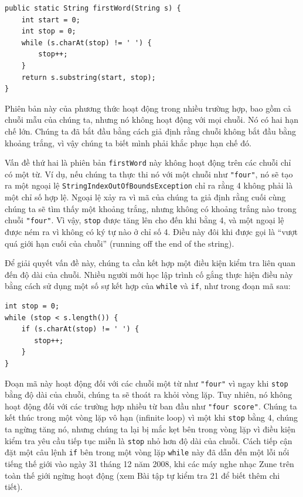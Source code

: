 \begin{verbatim}
public static String firstWord(String s) {
    int start = 0;
    int stop = 0;
    while (s.charAt(stop) != ' ') {
        stop++;
    }
    return s.substring(start, stop);
}
\end{verbatim}

Phiên bản này của phương thức hoạt động trong nhiều trường hợp, bao gồm cả chuỗi mẫu của chúng ta, nhưng nó không hoạt động với mọi chuỗi. Nó có hai hạn chế lớn. Chúng ta đã bắt đầu bằng cách giả định rằng chuỗi không bắt đầu bằng khoảng trắng, vì vậy chúng ta biết mình phải khắc phục hạn chế đó.

Vấn đề thứ hai là phiên bản \texttt{firstWord} này không hoạt động trên các chuỗi chỉ có một từ. Ví dụ, nếu chúng ta thực thi nó với một chuỗi như \texttt{"four"}, nó sẽ tạo ra một ngoại lệ \texttt{StringIndex\allowbreak{}OutOfBounds\allowbreak{}Exception} chỉ ra rằng 4 không phải là một chỉ số hợp lệ. Ngoại lệ xảy ra vì mã của chúng ta giả định rằng cuối cùng chúng ta sẽ tìm thấy một khoảng trắng, nhưng không có khoảng trắng nào trong chuỗi \texttt{"four"}. Vì vậy, \texttt{stop} được tăng lên cho đến khi bằng 4, và một ngoại lệ được ném ra vì không có ký tự nào ở chỉ số 4. Điều này đôi khi được gọi là ``vượt quá giới hạn cuối của chuỗi'' (running off the end of the string).

Để giải quyết vấn đề này, chúng ta cần kết hợp một điều kiện kiểm tra liên quan đến độ dài của chuỗi. Nhiều người mới học lập trình cố gắng thực hiện điều này bằng cách sử dụng một số sự kết hợp của \texttt{while} và \texttt{if}, như trong đoạn mã sau:

\begin{verbatim}
int stop = 0;
while (stop < s.length()) {
    if (s.charAt(stop) != ' ') {
       stop++;
    }
}
\end{verbatim}

Đoạn mã này hoạt động đối với các chuỗi một từ như \texttt{"four"} vì ngay khi \texttt{stop} bằng độ dài của chuỗi, chúng ta sẽ thoát ra khỏi vòng lặp. Tuy nhiên, nó không hoạt động đối với các trường hợp nhiều từ ban đầu như \texttt{"four score"}. Chúng ta kết thúc trong một vòng lặp vô hạn (infinite loop) vì một khi \texttt{stop} bằng 4, chúng ta ngừng tăng nó, nhưng chúng ta lại bị mắc kẹt bên trong vòng lặp vì điều kiện kiểm tra yêu cầu tiếp tục miễn là \texttt{stop} nhỏ hơn độ dài của chuỗi. Cách tiếp cận đặt một câu lệnh \texttt{if} bên trong một vòng lặp \texttt{while} này đã dẫn đến một lỗi nổi tiếng thế giới vào ngày 31 tháng 12 năm 2008, khi các máy nghe nhạc Zune trên toàn thế giới ngừng hoạt động (xem Bài tập tự kiểm tra 21 để biết thêm chi tiết).


